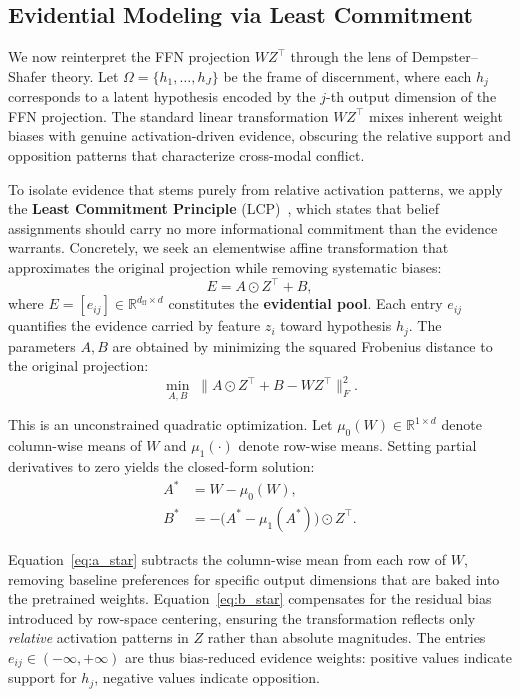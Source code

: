 \documentclass[preprint,12pt]{elsarticle}
\begin{document}
\subsection{Evidential Modeling via Least Commitment}

We now reinterpret the FFN projection $W Z^{\top}$ through the lens of Dempster--Shafer theory. Let $\Omega = \{h_1, \ldots, h_J\}$ be the frame of discernment, where each $h_j$ corresponds to a latent hypothesis encoded by the $j$-th output dimension of the FFN projection. The standard linear transformation $W Z^{\top}$ mixes inherent weight biases with genuine activation-driven evidence, obscuring the relative support and opposition patterns that characterize cross-modal conflict.

To isolate evidence that stems purely from relative activation patterns, we apply the \textbf{Least Commitment Principle} (LCP)~\cite{smets1993belief}, which states that belief assignments should carry no more informational commitment than the evidence warrants. Concretely, we seek an elementwise affine transformation that approximates the original projection while removing systematic biases:
\begin{equation}
E = A \odot Z^{\top} + B,
\label{eq:evidential_pool}
\end{equation}
where $E = [e_{ij}] \in \mathbb{R}^{d_{\text{ff}} \times d}$ constitutes the \textbf{evidential pool}. Each entry $e_{ij}$ quantifies the evidence carried by feature $z_i$ toward hypothesis $h_j$. The parameters $A, B$ are obtained by minimizing the squared Frobenius distance to the original projection:
\begin{equation}
\min_{A, B} \; \bigl\| A \odot Z^{\top} + B - W Z^{\top} \bigr\|_F^2.
\label{eq:lcp_objective}
\end{equation}

This is an unconstrained quadratic optimization. Let $\mu_0(W) \in \mathbb{R}^{1 \times d}$ denote column-wise means of $W$ and $\mu_1(\cdot)$ denote row-wise means. Setting partial derivatives to zero yields the closed-form solution:
\begin{align}
A^* &= W - \mu_0(W), \label{eq:a_star} \\[4pt]
B^* &= -\bigl(A^* - \mu_1(A^*)\bigr) \odot Z^{\top}. \label{eq:b_star}
\end{align}

Equation~\eqref{eq:a_star} subtracts the column-wise mean from each row of $W$, removing baseline preferences for specific output dimensions that are baked into the pretrained weights. Equation~\eqref{eq:b_star} compensates for the residual bias introduced by row-space centering, ensuring the transformation reflects only \emph{relative} activation patterns in $Z$ rather than absolute magnitudes. The entries $e_{ij} \in (-\infty, +\infty)$ are thus bias-reduced evidence weights: positive values indicate support for $h_j$, negative values indicate opposition.
\end{document}
